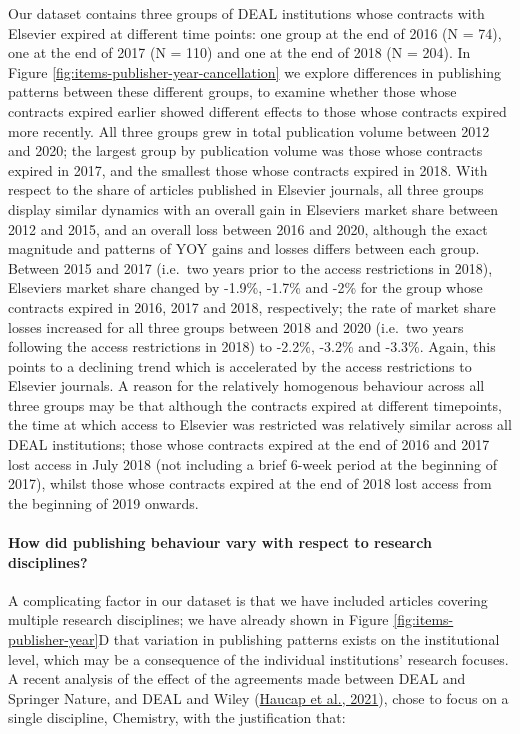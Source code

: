 \documentclass[
]{article}
\begin{document}
Our dataset contains three groups of DEAL institutions whose contracts with Elsevier expired at different time points: one group at the end of 2016 (N = 74), one at the end of 2017 (N = 110) and one at the end of 2018 (N = 204). In Figure \ref{fig:items-publisher-year-cancellation} we explore differences in publishing patterns between these different groups, to examine whether those whose contracts expired earlier showed different effects to those whose contracts expired more recently. All three groups grew in total publication volume between 2012 and 2020; the largest group by publication volume was those whose contracts expired in 2017, and the smallest those whose contracts expired in 2018. With respect to the share of articles published in Elsevier journals, all three groups display similar dynamics with an overall gain in Elsevier\textquotesingle s market share between 2012 and 2015, and an overall loss between 2016 and 2020, although the exact magnitude and patterns of YOY gains and losses differs between each group. Between 2015 and 2017 (i.e.~two years prior to the access restrictions in 2018), Elsevier\textquotesingle s market share changed by -1.9\%, -1.7\% and -2\% for the group whose contracts expired in 2016, 2017 and 2018, respectively; the rate of market share losses increased for all three groups between 2018 and 2020 (i.e.~two years following the access restrictions in 2018) to -2.2\%, -3.2\% and -3.3\%. Again, this points to a declining trend which is accelerated by the access restrictions to Elsevier journals. A reason for the relatively homogenous behaviour across all three groups may be that although the contracts expired at different timepoints, the time at which access to Elsevier was restricted was relatively similar across all DEAL institutions; those whose contracts expired at the end of 2016 and 2017 lost access in July 2018 (not including a brief 6-week period at the beginning of 2017), whilst those whose contracts expired at the end of 2018 lost access from the beginning of 2019 onwards.

\hypertarget{how-did-publishing-behaviour-vary-with-respect-to-research-disciplines}{%
\paragraph{How did publishing behaviour vary with respect to research disciplines?}\label{how-did-publishing-behaviour-vary-with-respect-to-research-disciplines}}

A complicating factor in our dataset is that we have included articles covering multiple research disciplines; we have already shown in Figure \ref{fig:items-publisher-year}D that variation in publishing patterns exists on the institutional level, which may be a consequence of the individual institutions' research focuses. A recent analysis of the effect of the agreements made between DEAL and Springer Nature, and DEAL and Wiley (\href{https://www.cesifo.org/en/publikationen/2021/working-paper/impact-german-deal-competition-academic-publishing-market}{Haucap et al., 2021}), chose to focus on a single discipline, Chemistry, with the justification that:
\end{document}
